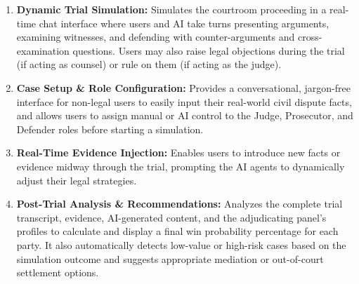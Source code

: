 \begin{enumerate}[leftmargin=80pt]
    \item \textbf{Dynamic Trial Simulation:} Simulates the courtroom proceeding in a real-time chat interface where users and AI take turns presenting arguments, examining witnesses, and defending with counter-arguments and cross-examination questions. Users may also raise legal objections during the trial (if acting as counsel) or rule on them (if acting as the judge).
    \item \textbf{Case Setup \& Role Configuration:} Provides a conversational, jargon-free interface for non-legal users to easily input their real-world civil dispute facts, and allows users to assign manual or AI control to the Judge, Prosecutor, and Defender roles before starting a simulation.
    \item \textbf{Real-Time Evidence Injection:} Enables users to introduce new facts or evidence midway through the trial, prompting the AI agents to dynamically adjust their legal strategies.
    \item \textbf{Post-Trial Analysis \& Recommendations:} Analyzes the complete trial transcript, evidence, AI-generated content, and the adjudicating panel's profiles to calculate and display a final win probability percentage for each party. It also automatically detects low-value or high-risk cases based on the simulation outcome and suggests appropriate mediation or out-of-court settlement options.

\end{enumerate}
